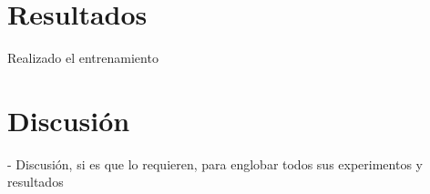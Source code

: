 \section{Resultados}
Realizado el entrenamiento 

\section{Discusión}

- Discusión, si es que lo requieren, para englobar todos sus experimentos y resultados
